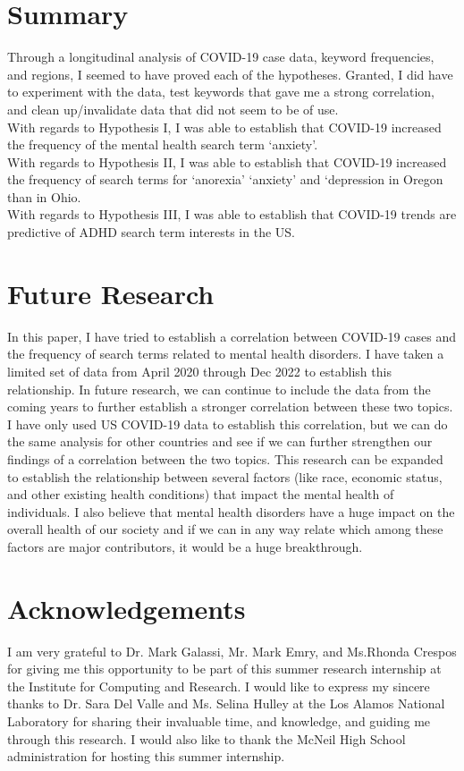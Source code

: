 \documentclass{article}
\begin{document}
\section{Summary}
Through a longitudinal analysis of COVID-19 case data, keyword frequencies, and regions, I seemed
to have proved each of the hypotheses. Granted, I did have to experiment with the data, test keywords
that gave me a strong correlation, and clean up/invalidate data that did not seem to be of use.
\\With regards to Hypothesis I, I was able to establish that COVID-19 increased the frequency of the
mental health search term ‘anxiety’.
\\With regards to Hypothesis II, I was able to establish that COVID-19 increased the frequency of
search terms for ‘anorexia’ ‘anxiety’ and ‘depression in Oregon than in Ohio.
\\With regards to Hypothesis III, I was able to establish that COVID-19 trends are predictive of ADHD
search term interests in the US.

\section{Future Research}
In this paper, I have tried to establish a correlation between COVID-19 cases and the frequency of
search terms related to mental health disorders. I have taken a limited set of data from April 2020
through Dec 2022 to establish this relationship. In future research, we can continue to include the data
from the coming years to further establish a stronger correlation between these two topics. I have only
used US COVID-19 data to establish this correlation, but we can do the same analysis for other
countries and see if we can further strengthen our findings of a correlation between the two topics.
This research can be expanded to establish the relationship between several factors (like race,
economic status, and other existing health conditions) that impact the mental health of individuals. I
also believe that mental health disorders have a huge impact on the overall health of our society and if
we can in any way relate which among these factors are major contributors, it would be a huge
breakthrough.

\section{Acknowledgements}
I am very grateful to Dr. Mark Galassi, Mr. Mark Emry, and Ms.Rhonda Crespos for giving me this
opportunity to be part of this summer research internship at the Institute for Computing and Research.
I would like to express my sincere thanks to Dr. Sara Del Valle and Ms. Selina Hulley at the Los
Alamos National Laboratory for sharing their invaluable time, and knowledge, and guiding me through this
research. I would also like to thank the McNeil High School administration for hosting this summer
internship.
\end{document}
